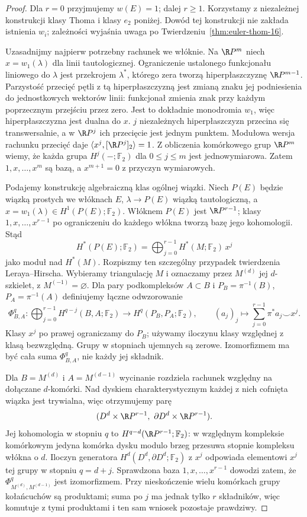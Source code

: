 \begin{proof}
Dla $r=0$ przyjmujemy $w(E)=1$; dalej $r\geq1$.
Korzystamy z niezależnej konstrukcji klasy Thoma
i klasy $e_2$ poniżej. Dowód tej konstrukcji nie
zakłada istnienia $w_i$; zależności wyjaśnia uwaga
po Twierdzeniu~\ref{thm:euler-thom-16}.

Uzasadnijmy najpierw potrzebny rachunek we włóknie.
Na $\R P^m$ niech $x=w_1(\lambda)$ dla linii
tautologicznej. Ograniczenie ustalonego funkcjonału
liniowego do $\lambda$ jest przekrojem $\lambda^*$,
którego zera tworzą hiperpłaszczyznę $\R P^{m-1}$.
Parzystość przecięć pętli z tą hiperpłaszczyzną
jest zmianą znaku jej podniesienia do jednostkowych
wektorów linii: funkcjonał zmienia znak przy każdym
poprzecznym przejściu przez zero. Jest to dokładnie
monodromia $w_1$, więc hiperpłaszczyzna jest dualna do $x$.
$j$ niezależnych hiperpłaszczyzn przecina się
transwersalnie, a w $\R P^j$ ich przecięcie jest
jednym punktem. Modułowa wersja rachunku przecięć daje
$\langle x^j,[\R P^j]_2\rangle=1$.
Z obliczenia komórkowego grup $\R P^m$ wiemy, że
każda grupa $H^j(-;\mathbb F_2)$ dla $0\leq j\leq m$
jest jednowymiarowa. Zatem $1,x,\ldots,x^m$ są bazą,
a $x^{m+1}=0$ z przyczyn wymiarowych.

Podajemy konstrukcję algebraiczną klas ogólnej wiązki.
Niech $P(E)$ będzie wiązką
prostych we włóknach $E$,
$\lambda\to P(E)$ wiązką
tautologiczną, a
$x=w_1(\lambda)\in
H^1(P(E);\mathbb F_2)$.
Włóknem $P(E)$ jest
$\R P^{r-1}$; klasy
$1,x,\ldots,x^{r-1}$
po ograniczeniu do
każdego włókna tworzą
bazę jego kohomologii.
Stąd
\[
 H^*(P(E);\mathbb F_2)
  =\bigoplus_{j=0}^{r-1}
     H^*(M;\mathbb F_2)\,x^j
\]
jako moduł nad $H^*(M)$.
Rozpiszmy ten szczególny przypadek twierdzenia Leraya--Hirscha.
Wybieramy triangulację $M$ i oznaczamy przez $M^{(d)}$ jej
$d$-szkielet, z $M^{(-1)}=\varnothing$. Dla pary podkompleksów
$A\subset B$ i $P_B=\pi^{-1}(B)$, $P_A=\pi^{-1}(A)$ definiujemy
łączne odwzorowanie
\[
 \Phi^q_{B,A}:\bigoplus_{j=0}^{r-1}H^{q-j}(B,A;\mathbb F_2)
 \longrightarrow H^q(P_B,P_A;\mathbb F_2),
 \qquad (a_j)_j\longmapsto\sum_{j=0}^{r-1}\pi^*a_j\smile x^j.
\]
Klasy $x^j$ po prawej ograniczamy do $P_B$; używamy iloczynu
klasy względnej z klasą bezwzględną. Grupy w stopniach ujemnych są zerowe.
Izomorfizmem ma być cała suma $\Phi^q_{B,A}$, nie każdy jej składnik.

Dla $B=M^{(d)}$ i $A=M^{(d-1)}$ wycinanie rozdziela rachunek względny
na dołączane $d$-komórki. Nad dyskiem charakterystycznym każdej
z nich cofnięta wiązka jest trywialna, więc otrzymujemy parę
\[
 (D^d\times\R P^{r-1},\ \partial D^d\times\R P^{r-1}).
\]
Jej kohomologia w stopniu $q$ to $H^{q-d}(\R P^{r-1};\mathbb F_2)$:
w względnym kompleksie komórkowym jedyna komórka dysku modulo
brzeg przesuwa stopnie kompleksu włókna o $d$.
Iloczyn generatora $H^d(D^d,\partial D^d;\mathbb F_2)$ z $x^j$
odpowiada elementowi $x^j$ tej grupy w stopniu $q=d+j$.
Sprawdzona baza $1,x,\ldots,x^{r-1}$ dowodzi zatem, że
$\Phi^q_{M^{(d)},M^{(d-1)}}$ jest izomorfizmem.
Przy nieskończenie wielu komórkach grupy kołańcuchów są produktami;
suma po $j$ ma jednak tylko $r$ składników, więc komutuje z tymi
produktami i ten sam wniosek pozostaje prawdziwy.


\end{proof}
